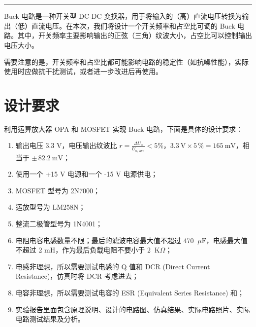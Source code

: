 \documentclass[UTF8]{article}
\def\kO{\ \mathrm{K}\Omega}
\def\uF{\ \mu\mathrm{F}}
\def\kO{\ \mathrm{K}\Omega}
\def\uF{\ \mu\mathrm{F}}
\theoremstyle{MyLineTheoremStyle} %
\theoremstyle{MyBlockTheoremStyle} %
\theoremstyle{MySubsubsectionStyle} %
\begin{document}
\begin{center}\large
    \vspace*{-0.8cm}
    \\\vspace{0.2cm}
    \\
\end{center}
\vspace{-0.5cm}
\noindent\rule{\textwidth}{0.075em}   %
\vspace{-1.0cm}

\setcounter{tocdepth}{2}  %
\noindent\tableofcontents\thispagestyle{fancy}   %
\newpage



Buck 电路是一种开关型 DC-DC 变换器，用于将输入的（高）直流电压转换为输出（低）直流电压。在本次，我们将设计一个开关频率和占空比可调的 Buck 电路。其中，开关频率主要影响输出的正弦（三角）纹波大小，占空比可以控制输出电压大小。

需要注意的是，开关频率和占空比都可能影响电路的稳定性（如抗噪性能），实际使用时应做抗干扰测试，或者进一步改进后再使用。


\section{设计要求}
利用运算放大器 OPA 和 MOSFET 实现 Buck 电路，下面是具体的设计要求：
\begin{enumerate}
\item 输出电压 3.3 V，电压输出纹波比 $r = \frac{\Delta U_{\text{o}}}{U_{\text{o, ave}}} < 5\%$，$3.3\ \mathrm{V}\times 5\,\% = 165\ \mathrm{mV}$，相当于 $\pm\, 82.2\ \mathrm{mV}$；
\item 使用一个 +15 V 电源和一个 -15 V 电源供电；
\item MOSFET 型号为 2N7000；
\item 运放型号为 LM258N；
\item 整流二极管型号为 1N4001；
\item 电阻电容电感数量不限；最后的滤波电容最大值不超过 470 $\uF$，电感最大值不超过 2 mH，作为最后负载电阻不要小于 2 $\kO$；
\item 电感非理想，所以需要测试电感的 Q 值和 DCR (Direct Current Resistance)，仿真时将 DCR 考虑进去；
\item 电容非理想，所以需要测试电容的 ESR (Equivalent Series Resistance) 和；
\item 实验报告里面包含原理说明、设计的电路图、仿真结果、实际电路照片、实际电路测试结果及分析。
\end{enumerate}
\end{document}
